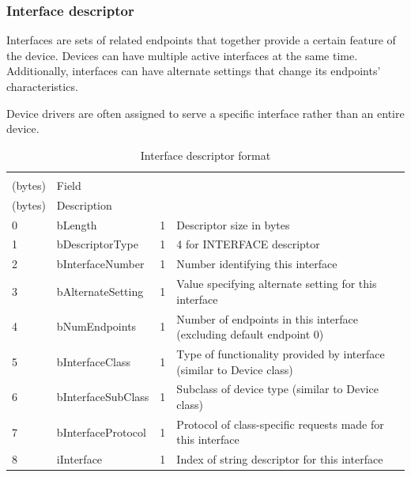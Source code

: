 \documentclass{article}
\begin{document}
\subsubsection{Interface descriptor}

Interfaces are sets of related endpoints that together provide a certain feature
of the device. Devices can have multiple active interfaces at the same time.
Additionally, interfaces can have alternate settings that change its endpoints' characteristics.
\cite[p. 244]{usbstd}

Device drivers are often assigned to serve a specific interface rather than an entire device.

\begin{table}[H]
  \caption{Interface descriptor format \cite[p. 268f.]{usbstd}}
  \centering
  \begin{tabularx}{\textwidth}{l | l | l | X}
    \begin{tabular}{@{}l} Offset \\ (bytes) \end{tabular} & Field &
    \begin{tabular}{@{}l} Size \\ (bytes) \end{tabular} & Description \\ \hline

    0 & bLength & 1 & Descriptor size in bytes \\
    1 & bDescriptorType & 1 & 4 for INTERFACE descriptor \\
    2 & bInterfaceNumber & 1 & Number identifying this interface \\
    3 & bAlternateSetting & 1 & Value specifying alternate setting for this interface \\
    4 & bNumEndpoints & 1 & Number of endpoints in this interface (excluding default endpoint 0) \\
    5 & bInterfaceClass & 1 & Type of functionality provided by interface (similar to Device class) \\
    6 & bInterfaceSubClass & 1 & Subclass of device type (similar to Device class) \\
    7 & bInterfaceProtocol & 1 & Protocol of class-specific requests made for this interface \\
    8 & iInterface & 1 & Index of string descriptor for this interface \\
  \end{tabularx}
\end{table}
\end{document}
